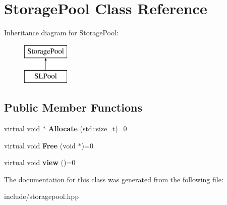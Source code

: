 \hypertarget{class_storage_pool}{}\section{Storage\+Pool Class Reference}
\label{class_storage_pool}
Inheritance diagram for Storage\+Pool\+:\begin{figure}[H]
\begin{center}
\leavevmode
\includegraphics[height=2.000000cm]{class_storage_pool}
\end{center}
\end{figure}
\subsection*{Public Member Functions}
\begin{DoxyCompactItemize}
\item 
virtual void $\ast$ {\bfseries Allocate} (std\+::size\+\_\+t)=0\hypertarget{class_storage_pool_a41c66733db91a537c883c939996723b7}{}\label{class_storage_pool_a41c66733db91a537c883c939996723b7}

\item 
virtual void {\bfseries Free} (void $\ast$)=0\hypertarget{class_storage_pool_a2120a75c4562735372d089685828b8df}{}\label{class_storage_pool_a2120a75c4562735372d089685828b8df}

\item 
virtual void {\bfseries view} ()=0\hypertarget{class_storage_pool_a5e5484141dce4e835bed1153b1f0b662}{}\label{class_storage_pool_a5e5484141dce4e835bed1153b1f0b662}

\end{DoxyCompactItemize}


The documentation for this class was generated from the following file\+:\begin{DoxyCompactItemize}
\item 
include/storagepool.\+hpp\end{DoxyCompactItemize}
